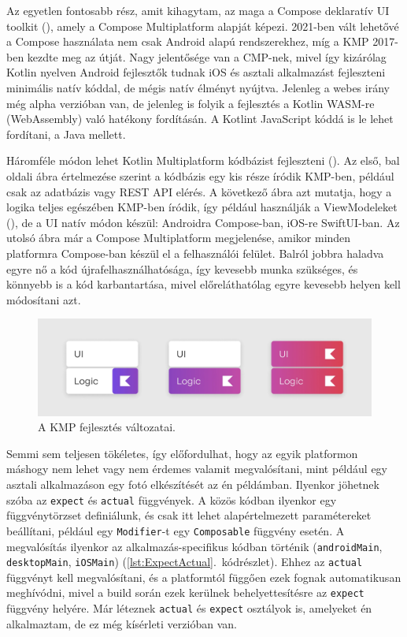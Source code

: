 Az egyetlen fontosabb rész, amit kihagytam, az maga a Compose deklaratív UI toolkit (), amely a Compose Multiplatform alapját képezi.  
2021-ben vált lehetővé a Compose használata nem csak Android alapú rendszerekhez, míg a KMP 2017-ben kezdte meg az útját.  
Nagy jelentősége van a CMP-nek, mivel így kizárólag Kotlin nyelven Android fejlesztők tudnak iOS és asztali alkalmazást fejleszteni minimális natív kóddal, de mégis natív élményt nyújtva.  
Jelenleg a webes irány még alpha verzióban van, de jelenleg is folyik a fejlesztés a Kotlin WASM-re (WebAssembly) való hatékony fordításán. A Kotlint JavaScript kóddá is le lehet fordítani, a Java mellett.  

Háromféle módon lehet Kotlin Multiplatform kódbázist fejleszteni ().  
Az első, bal oldali ábra értelmezése szerint a kódbázis egy kis része íródik KMP-ben, például csak az adatbázis vagy REST API elérés.  
A következő ábra azt mutatja, hogy a logika teljes egészében KMP-ben íródik, így például használják a ViewModeleket (), de a UI natív módon készül: Androidra Compose-ban, iOS-re SwiftUI-ban.  
Az utolsó ábra már a Compose Multiplatform megjelenése, amikor minden platformra Compose-ban készül el a felhasználói felület.  
Balról jobbra haladva egyre nő a kód újrafelhasználhatósága, így kevesebb munka szükséges, és könnyebb is a kód karbantartása, mivel előreláthatólag egyre kevesebb helyen kell módosítani azt.

\begin{figure}[!ht]
    \centering
    \includegraphics[width=150mm, keepaspectratio]{figures/KMP-types.png}
    \caption{A KMP fejlesztés változatai. \cite{KotlinMultiplatformStable}}
    \label{fig:KMPTypes}
\end{figure}

Semmi sem teljesen tökéletes, így előfordulhat, hogy az egyik platformon máshogy nem lehet vagy nem érdemes valamit megvalósítani, mint például egy asztali alkalmazáson egy fotó elkészítését az én példámban.  
Ilyenkor jöhetnek szóba az \texttt{expect} és \texttt{actual} függvények. A közös kódban ilyenkor egy függvénytörzset definiálunk, és csak itt lehet alapértelmezett paramétereket beállítani, például egy \texttt{Modifier}-t egy \texttt{Composable} függvény esetén.  
A megvalósítás ilyenkor az alkalmazás-specifikus kódban történik (\texttt{androidMain}, \texttt{desktopMain}, \texttt{iOSMain}) (\ref{lst:ExpectActual}.~kódrészlet).  
Ehhez az \texttt{actual} függvényt kell megvalósítani, és a platformtól függően ezek fognak automatikusan meghívódni, mivel a build során ezek kerülnek behelyettesítésre az \texttt{expect} függvény helyére.  
Már léteznek \texttt{actual} és \texttt{expect} osztályok is, amelyeket én alkalmaztam, de ez még kísérleti verzióban van.


